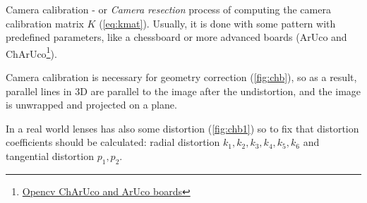 Camera calibration - or \textit{Camera resection} process of computing the camera calibration matrix $K$ (\autoref{eq:kmat}).
Usually, it is done with some pattern with predefined parameters, like a chessboard or more advanced boards (ArUco and ChArUco\footnote{\href{https://docs.opencv.org/4.x/df/d4a/tutorial_charuco_detection.html}{Opencv ChArUco and ArUco boards}}).

Camera calibration is necessary for geometry correction (\autoref{fig:chb}), so as a result, parallel lines in 3D are parallel to the image after the undistortion, and the image is unwrapped and projected on a plane.

In a real world lenses has also some distortion (\autoref{fig:chb1}) so to fix that distortion coefficients should be calculated: radial distortion $k_1, k_2, k_3, k_4, k_5, k_6$ and tangential distortion $p_1, p_2$.

